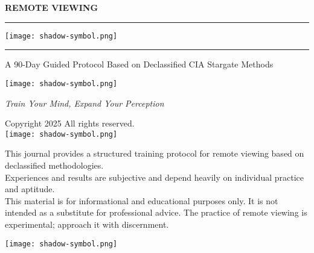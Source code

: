 \documentclass[10pt,twoside,final]{book} %
\makeatletter
\newcommand{\themesymbol}{%
  \texttt{[image: shadow-symbol.png]}%
}
\newcommand{\journaltitle}{REMOTE VIEWING}
\newcommand{\journalsubtitle}{A 90-Day Guided Protocol Based on Declassified CIA Stargate Methods}
\newcommand{\journalfootertext}{Train Your Mind, Expand Your Perception} %
\newcommand{\elegantdivider}{%
  \begin{center}
    \textcolor{rvprimary}{\rule{0.3\textwidth}{0.7pt}}%
    \themesymbol%
    \textcolor{rvprimary}{\rule{0.3\textwidth}{0.7pt}}%
  \end{center}
}
\newcommand{\cleardoublepageWithSymbol}{%
  \clearpage %
  \if@twoside %
    \ifodd\c@page %
    \else %
      \thispagestyle{fancy} %
      \begingroup %
        \vspace*{0pt} %
        \vfill %
        \centering %
        \noindent 
        \texttt{[image: shadow-symbol.png]}
        \vfill %
      \endgroup
      \newpage    %
      \if@twocolumn\if@firstcolumn\else\hbox{}\newpage\fi\fi
    \fi
  \fi
}
\makeatother
\begin{document}
\frontmatter %

\begin{titlepage}
\centering
\vspace*{0.5cm}
{\Huge\bfseries\color{titlecolor} \journaltitle\par}
\vspace{0.5cm}
\elegantdivider
\vspace{0.5cm}
{\Large\color{titlecolor} \journalsubtitle \par}
\vspace{0.5cm}
\texttt{[image: shadow-symbol.png]}\par %
\vspace{0.5cm}
{\Large\itshape\color{rvaccent} \journalfootertext\par}
\end{titlepage}

\thispagestyle{empty}
\vspace*{\fill}
\begin{center}
\begin{mdframed}[backgroundcolor=rvlight!80, linewidth=0.7pt, linecolor=rvprimary, shadow=true, shadowsize=1pt, shadowcolor=graydark!40, roundcorner=3pt, innertopmargin=15pt, innerbottommargin=15pt]
\centering
Copyright \textcopyright{} 2025 %
All rights reserved.\\
\vspace{1cm}
\texttt{[image: shadow-symbol.png]}\par %
\vspace{1cm}
This journal provides a structured training protocol for remote viewing based on declassified methodologies. \\
Experiences and results are subjective and depend heavily on individual practice and aptitude.\\
\vspace{0.2cm}
This material is for informational and educational purposes only. It is not intended as a substitute for professional advice. The practice of remote viewing is experimental; approach it with discernment.
\end{mdframed}
\end{center}
\vspace*{\fill}
\cleardoublepageWithSymbol

\end{document}
